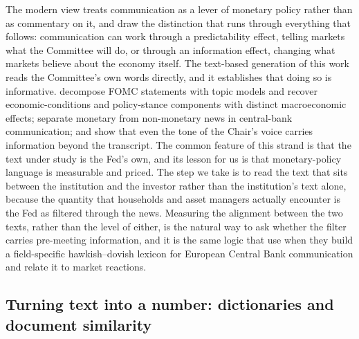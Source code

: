 \documentclass[11pt,a4paper]{article}
\begin{document}
The modern view treats communication as a lever of monetary policy rather than as
commentary on it, and \citet{blinder2008central} draw the distinction that runs
through everything that follows: communication can work through a predictability
effect, telling markets what the Committee will do, or through an information
effect, changing what markets believe about the economy itself. The text-based
generation of this work reads the Committee's own words directly, and it
establishes that doing so is informative. \citet{hansen2016shocking} decompose FOMC
statements with topic models and recover economic-conditions and policy-stance
components with distinct macroeconomic effects; \citet{cieslak2019non} separate
monetary from non-monetary news in central-bank communication; and
\citet{gorodnichenko2023voice} show that even the tone of the Chair's voice carries
information beyond the transcript. The common feature of this strand is that the
text under study is the Fed's own, and its lesson for us is that monetary-policy
language is measurable and priced. The step we take is to read the text that sits
between the institution and the investor rather than the institution's text alone,
because the quantity that households and asset managers actually encounter is the
Fed as filtered through the news. Measuring the alignment between the two texts,
rather than the level of either, is the natural way to ask whether the filter
carries pre-meeting information, and it is the same logic that
\citet{picault2017words} use when they build a field-specific hawkish--dovish
lexicon for European Central Bank communication and relate it to market reactions.

\subsection{Turning text into a number: dictionaries and document similarity}
\end{document}

